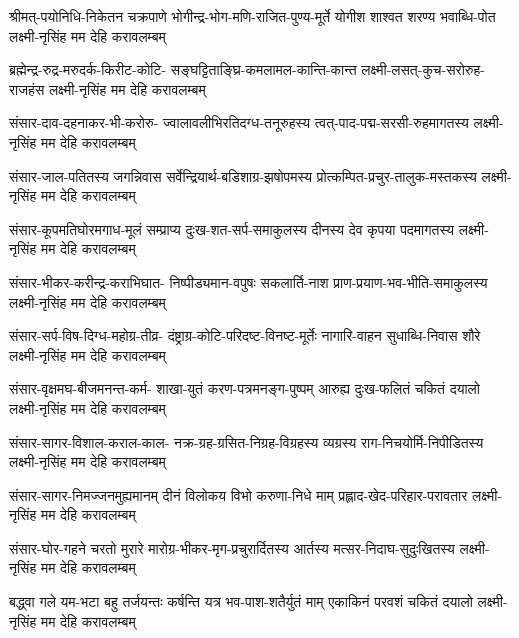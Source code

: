 


\fourlineindentedshloka
{श्रीमत्-पयोनिधि-निकेतन चक्रपाणे}
{भोगीन्द्र-भोग-मणि-राजित-पुण्य-मूर्ते}
{योगीश शाश्वत शरण्य भवाब्धि-पोत}
{लक्ष्मी-नृसिंह मम देहि करावलम्बम्}

\fourlineindentedshloka
{ब्रह्मेन्द्र-रुद्र-मरुदर्क-किरीट-कोटि-}
{सङ्घट्टिताङ्घ्रि-कमलामल-कान्ति-कान्त}
{लक्ष्मी-लसत्-कुच-सरोरुह-राजहंस}
{लक्ष्मी-नृसिंह मम देहि करावलम्बम्}

\fourlineindentedshloka
{संसार-दाव-दहनाकर-भी-करोरु-}
{ज्वालावलीभिरतिदग्ध-तनूरुहस्य}
{त्वत्-पाद-पद्म-सरसी-रुहमागतस्य}
{लक्ष्मी-नृसिंह मम देहि करावलम्बम्}

\fourlineindentedshloka
{संसार-जाल-पतितस्य जगन्निवास}
{सर्वेन्द्रियार्थ-बडिशाग्र-झषोपमस्य}
{प्रोत्कम्पित-प्रचुर-तालुक-मस्तकस्य}
{लक्ष्मी-नृसिंह मम देहि करावलम्बम्}

\fourlineindentedshloka
{संसार-कूपमतिघोरमगाध-मूलं}
{सम्प्राप्य दुःख-शत-सर्प-समाकुलस्य}
{दीनस्य देव कृपया पदमागतस्य}
{लक्ष्मी-नृसिंह मम देहि करावलम्बम्}

\fourlineindentedshloka
{संसार-भीकर-करीन्द्र-कराभिघात-}
{निष्पीड्यमान-वपुषः सकलार्ति-नाश}
{प्राण-प्रयाण-भव-भीति-समाकुलस्य}
{लक्ष्मी-नृसिंह मम देहि करावलम्बम्}

\fourlineindentedshloka
{संसार-सर्प-विष-दिग्ध-महोग्र-तीव्र-}
{दंष्ट्राग्र-कोटि-परिदष्ट-विनष्ट-मूर्तेः}
{नागारि-वाहन सुधाब्धि-निवास शौरे}
{लक्ष्मी-नृसिंह मम देहि करावलम्बम्}

\fourlineindentedshloka
{संसार-वृक्षमघ-बीजमनन्त-कर्म-}
{शाखा-युतं करण-पत्रमनङ्ग-पुष्पम्}
{आरुह्य दुःख-फलितं चकितं दयालो}
{लक्ष्मी-नृसिंह मम देहि करावलम्बम्}

\fourlineindentedshloka
{संसार-सागर-विशाल-कराल-काल-}
{नक्र-ग्रह-ग्रसित-निग्रह-विग्रहस्य}
{व्यग्रस्य राग-निचयोर्मि-निपीडितस्य}
{लक्ष्मी-नृसिंह मम देहि करावलम्बम्}

\fourlineindentedshloka
{संसार-सागर-निमज्जनमुह्यमानम्}
{दीनं विलोकय विभो करुणा-निधे माम्}
{प्रह्लाद-खेद-परिहार-परावतार}
{लक्ष्मी-नृसिंह मम देहि करावलम्बम्}

\fourlineindentedshloka
{संसार-घोर-गहने चरतो मुरारे}
{मारोग्र-भीकर-मृग-प्रचुरार्दितस्य}
{आर्तस्य मत्सर-निदाघ-सुदुःखितस्य}
{लक्ष्मी-नृसिंह मम देहि करावलम्बम्}

\fourlineindentedshloka
{बद्{}ध्वा गले यम-भटा बहु तर्जयन्तः}
{कर्षन्ति यत्र भव-पाश-शतैर्युतं माम्}
{एकाकिनं परवशं चकितं दयालो}
{लक्ष्मी-नृसिंह मम देहि करावलम्बम्}

